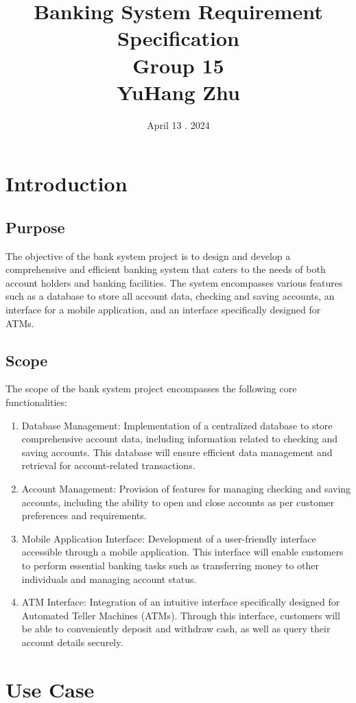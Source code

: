 \documentclass[12pt]{article}
\title{\textbf{Banking System Requirement Specification}\\[1cm]
\large Group 15 \\[0.5cm]
{\normalfont YuHang Zhu}}
\author{}
\date{April 13 . 2024}
\begin{document}
\begin{titlepage}
\maketitle
\end{titlepage}

\newpage

\section{Introduction}



\subsection{Purpose}

The objective of the bank system project is to design and develop a comprehensive and efficient banking system that caters to the needs of both account holders and banking facilities. The system encompasses various features such as a database to store all account data, checking and saving accounts, an interface for a mobile application, and an interface specifically designed for ATMs.

\subsection{Scope}

The scope of the bank system project encompasses the following core functionalities:

\begin{enumerate}
\item Database Management: Implementation of a centralized database to store comprehensive account data, including information related to checking and saving accounts. This database will ensure efficient data management and retrieval for account-related transactions.

\item Account Management: Provision of features for managing checking and saving accounts, including the ability to open and close accounts as per customer preferences and requirements.

\item Mobile Application Interface: Development of a user-friendly interface accessible through a mobile application. This interface will enable customers to perform essential banking tasks such as transferring money to other individuals and managing account status.

\item ATM Interface: Integration of an intuitive interface specifically designed for Automated Teller Machines (ATMs). Through this interface, customers will be able to conveniently deposit and withdraw cash, as well as query their account details securely.
\end{enumerate}

\newpage 
\section{Use Case}
\end{document}

